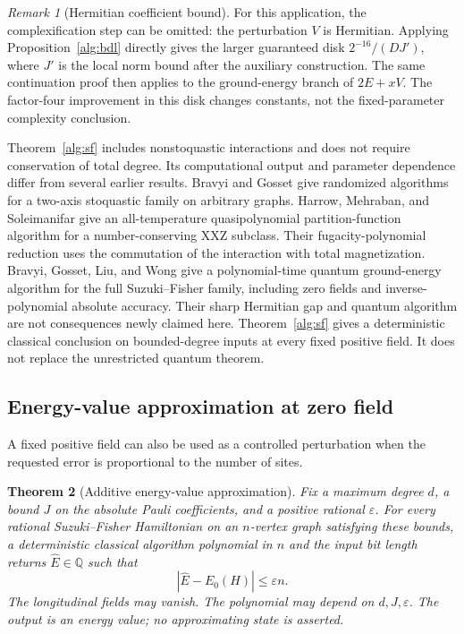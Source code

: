 \documentclass[reqno]{amsart}
\newtheorem{theorem}{Theorem}[section]
\theoremstyle{definition}
\theoremstyle{remark}
\newtheorem{remark}[theorem]{Remark}
\begin{document}
\begin{remark}[Hermitian coefficient bound]
\label{alg:hermitian-radius}
For this application, the complexification step can be omitted:
the perturbation \(V\) is Hermitian.  Applying
Proposition~\ref{alg:bdl} directly gives the larger guaranteed
disk \(2^{-16}/(DJ')\), where \(J'\) is the local norm bound
after the auxiliary construction.  The same continuation proof
then applies to the ground-energy branch of \(2E+xV\).
The factor-four improvement in this disk changes constants,
not the fixed-parameter complexity conclusion.
\end{remark}

Theorem~\ref{alg:sf} includes nonstoquastic interactions and
does not require conservation of total degree.  Its computational
output and parameter dependence differ from several earlier
results.  Bravyi and Gosset \cite{BG17} give randomized
algorithms for a two-axis stoquastic family on arbitrary graphs.
Harrow, Mehraban, and Soleimanifar \cite[Section~7 of the full version]{HMS20}
give an all-temperature quasipolynomial partition-function
algorithm for a number-conserving XXZ subclass.  Their
fugacity-polynomial reduction uses the commutation of the
interaction with total magnetization.
Bravyi, Gosset, Liu, and Wong \cite{BGLW26} give a polynomial-time
quantum ground-energy algorithm for the full Suzuki--Fisher
family, including zero fields and inverse-polynomial absolute
accuracy.  Their sharp Hermitian gap and quantum algorithm are
not consequences newly claimed here.
Theorem~\ref{alg:sf} gives a deterministic classical conclusion
on bounded-degree inputs at every fixed positive field.
It does not replace the unrestricted quantum theorem.

\subsection{Energy-value approximation at zero field}
\label{alg:value-subsection}

A fixed positive field can also be used as a controlled
perturbation when the requested error is proportional to the
number of sites.

\begin{theorem}[Additive energy-value approximation]
\label{alg:value}
Fix a maximum degree \(d\), a bound \(J\) on the absolute
Pauli coefficients, and a positive rational \(\varepsilon\).
For every rational Suzuki--Fisher Hamiltonian on an
\(n\)-vertex graph satisfying these bounds, a deterministic
classical algorithm polynomial in \(n\) and the input bit length
returns \(\widehat E\in\mathbb Q\) such that
\[
 |\widehat E-E_0(H)|\le\varepsilon n.
 \]
The longitudinal fields may vanish.
The polynomial may depend on \(d,J,\varepsilon\).
The output is an energy value; no approximating state is
asserted.
\end{theorem}
\end{document}
